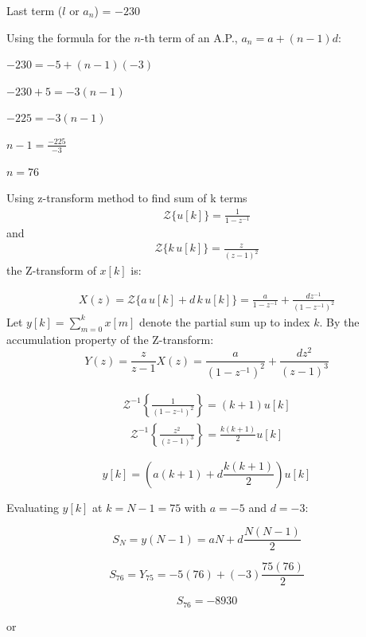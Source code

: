 \begin{enumerate}[label=\thesubsection.\arabic*, ref=\thesubsection.\theenumi]
	Last term ($l$ or $a_n$) = $-230$
	
	
	Using the formula for the $n$-th term of an A.P., $a_n = a + (n - 1)d$:
	
		
	$	-230 = -5 + (n - 1)(-3) $
		
	$	-230 + 5 = -3(n - 1)$ 
		
	$	-225 = -3(n - 1) $
		
	$	n - 1 = \frac{-225}{-3} $ 
		
		$n = 76$
		
		Using z-transform method to find sum of k terms
	 \begin{align}
		\mathcal{Z}\{u[k]\} = \frac{1}{1-z^{-1}} 
		\end{align}
		and 
		\begin{align}
			\mathcal{Z}\{k\,u[k]\} = \frac{z}{(z-1)^2}
		\end{align} the Z-transform of $x[k]$ is:
		
	\begin{align}
	X(z) = \mathcal{Z}\{a\,u[k] + d\,k\,u[k]\} = \frac{a}{  1- z^{-1}} + \frac{dz^{-1}}{(1-z^{-1})^2}
	\end{align}
	Let $y[k] = \sum_{m=0}^{k} x[m]$ denote the partial sum up to index $k$. By the accumulation property of the Z-transform:
	$$
	Y(z) = \frac{z}{z - 1} X(z) = \frac{a}{(1- z^{-1})^2} + \frac{dz^2}{(z - 1)^3}
	$$
	
	\begin{align}
		\mathcal{Z}^{-1}\left\{ \frac{1}{(1-z^{-1})^2}\right\}=(k+1)u[k]
	\end{align}
	\begin{align}
		\mathcal{Z}^{-1}\left\{ \frac{z^2}{(z-1)^3}\right\}=\frac{k(k+1)}{2}u[k]
	\end{align}
	
	$$y[k]= \left(a(k+1) + d\frac{k(k+1)}{2}\right)u[k]$$
	
	Evaluating $y[k]$ at $k = N - 1 = 75$ with $a = -5$ and $d = -3$:
	
	$$S_N=y(N-1)= aN+ d\frac{N(N-1)}{2}$$
	
	$$S_{76}= Y_{75}= -5(76) + (-3)\frac{75(76)}{2}  $$
	
	$$S_{76}= -8930$$
	
	\begin{center}
		or
	\end{center}
	

\end{enumerate}
